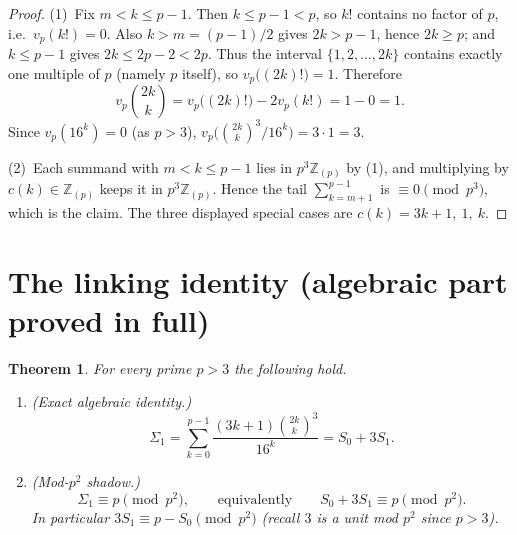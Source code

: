 \documentclass[12pt]{article}
\newtheorem{theorem}{Theorem}
\theoremstyle{remark}
\newcommand{\bin}[2]{\binom{#1}{#2}}
\newcommand{\Zp}{\mathbb{Z}_{(p)}}
\begin{document}
\begin{proof}
(1)\ Fix $m<k\le p-1$.  Then $k\le p-1<p$, so $k!$ contains no factor of $p$,
i.e.\ $v_p(k!)=0$.  Also $k>m=(p-1)/2$ gives $2k>p-1$, hence $2k\ge p$; and
$k\le p-1$ gives $2k\le2p-2<2p$.  Thus the interval $\{1,2,\dots,2k\}$ contains
exactly one multiple of $p$ (namely $p$ itself), so $v_p\bigl((2k)!\bigr)=1$.
Therefore
\[
v_p\!\bin{2k}{k}=v_p\bigl((2k)!\bigr)-2v_p(k!)=1-0=1 .
\]
Since $v_p(16^k)=0$ (as $p>3$), $v_p\!\bigl(\bin{2k}{k}^3/16^k\bigr)=3\cdot1=3$.

(2)\ Each summand with $m<k\le p-1$ lies in $p^3\Zp$ by (1), and
multiplying by $c(k)\in\Zp$ keeps it in $p^3\Zp$.  Hence
the tail $\sum_{k=m+1}^{p-1}$ is $\equiv0\pmod{p^3}$, which is the claim.  The
three displayed special cases are $c(k)=3k+1,\ 1,\ k$.
\end{proof}

\section{The linking identity (algebraic part proved in full)}

\begin{theorem}\label{thm:link}
For every prime $p>3$ the following hold.
\begin{enumerate}
\item \emph{(Exact algebraic identity.)}
\begin{equation}\label{eq:linkalg}
\Sigma_1=\sum_{k=0}^{p-1}\frac{(3k+1)\bin{2k}{k}^3}{16^k}=S_0+3S_1 .
\end{equation}
\item \emph{(Mod-$p^2$ shadow.)}
\begin{equation}\label{eq:linkcong}
\Sigma_1\equiv p\pmod{p^2},\qquad\text{equivalently}\qquad
S_0+3S_1\equiv p\pmod{p^2}.
\end{equation}
In particular $3S_1\equiv p-S_0\pmod{p^2}$ (recall $3$ is a unit mod $p^2$
since $p>3$).
\end{enumerate}
\end{theorem}
\end{document}
